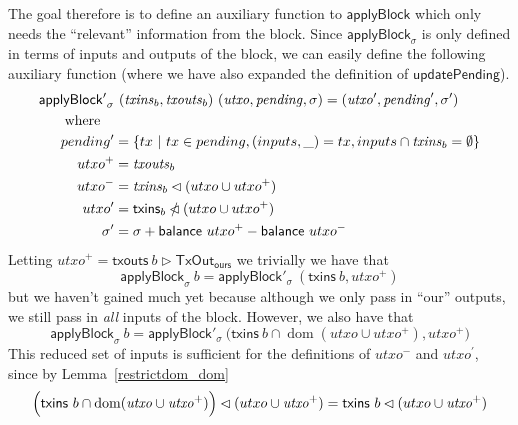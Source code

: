 \documentclass{article}
\DeclareMathOperator{\dom}{dom}
\newcommand{\restrictdom}{\lhd}
\newcommand{\subtractdom}{\mathbin{\slashed{\restrictdom}}}
\newcommand{\restrictrange}{\rhd}
\begin{document}
The goal therefore is to define an auxiliary function to $\mathsf{applyBlock}$
which only needs the ``relevant'' information from the block.
Since $\mathsf{applyBlock}_\sigma$ is only defined in terms of inputs and
outputs of the block, we can easily define the following auxiliary function
(where we have also expanded the definition of $\mathsf{updatePending}$).
%
\begin{equation*}
\begin{split}
\mathsf{applyBlock'}_\sigma & ~ (\mathit{txins}_b, \mathit{txouts}_b) ~ (\mathit{utxo}, \mathit{pending}, \sigma) = (\mathit{utxo}^\prime, \mathit{pending}^\prime, \sigma^\prime) \\
\text{where} \quad \\
    pending^\prime & = \{ tx ~|~ tx \in pending, (inputs, \_) = tx, inputs \cap \mathit{txins}_b = \emptyset \} \\
    utxo^+ & = \mathit{txouts}_b \\
    utxo^- & = \mathit{txins}_b \restrictdom (utxo \cup utxo^+) \\
    utxo^\prime & = \mathsf{txins}_b \subtractdom (utxo \cup utxo^+) \\
    \sigma^\prime & = \sigma + \mathsf{balance} ~ utxo^+ - \mathsf{balance} ~ utxo^- \\
\end{split}
\end{equation*}
%
Letting
%
\begin{math}
\mathit{utxo}^+ = \mathsf{txouts} ~ b \restrictrange \mathsf{TxOut_{ours}}
\end{math}
%
we trivially we have that
%
\begin{equation}
  \mathsf{applyBlock}_\sigma ~ b
= \mathsf{applyBlock}'_\sigma ~ (\mathsf{txins} ~ b, \mathit{utxo}^+)
\end{equation}
%
but we haven't gained much yet because although we only pass in ``our'' outputs,
we still pass in \emph{all} inputs of the block. However, we also have that
%
\begin{equation}
  \mathsf{applyBlock}_\sigma ~ b
= \mathsf{applyBlock}'_\sigma ~ \Big( \mathsf{txins} ~ b \cap \dom (\mathit{utxo} \cup \mathit{utxo}^+), \mathit{utxo}^+ \Bigr)
\end{equation}
%
This reduced set of inputs is sufficient for the definitions of
$\mathit{utxo}^-$ and $\mathit{utxo}^\prime$, since by
Lemma~\ref{restrictdom_dom}
%
\begin{equation*}
  \Bigl( \mathsf{txins} ~ b \cap \dom (\mathit{utxo} \cup \mathit{utxo}^+) \Bigr) \restrictdom (utxo \cup \mathit{utxo}^+) \\
= \mathsf{txins} ~ b \restrictdom (utxo \cup \mathit{utxo}^+)
\end{equation*}
\end{document}
